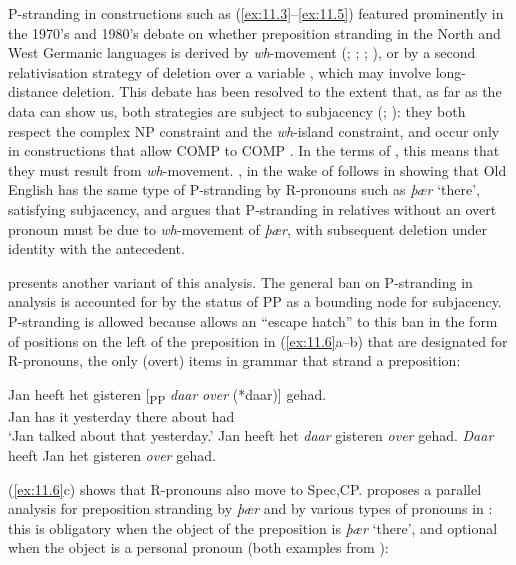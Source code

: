 \documentclass[output=paper]{langsci/langscibook}
\begin{document}
P-stranding in constructions such as (\ref{ex:11.3}--\ref{ex:11.5}) featured prominently in the
1970’s and 1980’s debate on whether preposition stranding in the North and West
Germanic languages is derived by \textit{wh}-movement
(\citealt{Chomsky1977,ChomskyLasnik1977}; \citealt[286--297]{vanRiemsdijk1978};
\citealt{Vat1978}; \citealt{vanKemenade1987}), or by a second relativisation
strategy of deletion over a variable \citep{Maling1976,BresnanGrimshaw1978,Allen1977,Allen1980}, which may
involve long-distance deletion. This debate has been resolved to the extent
that, as far as the data can show us, both strategies are subject to subjacency
(\citealt{Allen1980}; \citealt{vanKemenade1987}): they both respect the complex
NP constraint and the \textit{wh}-island constraint, and occur only in
constructions that allow COMP to COMP . In the terms of
\textcite{Chomsky1977,ChomskyLasnik1977}, this means that they must result from
\textit{wh}-movement. \citet{Vat1978}, in the wake of
\citet{vanRiemsdijk1978} follows \citet{Allen1977} in showing that Old English
has the same type of P-stranding by R-pronouns such
as \textit{þær} ‘there’, satisfying subjacency, and argues that
P-stranding in relatives without an overt pronoun
must be due to \textit{wh}-movement of \textit{þær}, with subsequent deletion
under identity with the antecedent.

 presents another variant of this analysis. The general
ban on P-stranding in  analysis is accounted for by
the status of PP as a bounding node for subjacency.  P-stranding is
allowed because  allows an “escape hatch” to this ban in the form of
positions on the left of the preposition in (\ref{ex:11.6}a--b) that are designated for
R-pronouns, the only (overt) items in  grammar that strand a preposition:

\ea%
    \label{ex:11.6}
    	\ea
	\gll Jan heeft het gisteren [\textsubscript{PP} \textit{daar} \textit{over} (*daar)] gehad.\\
        		Jan has    it   yesterday {}    there  about   {}         had\\
	\glt ‘Jan talked about that yesterday.’
	\ex Jan heeft het \textit{daar} gisteren \textit{over} gehad.
	\ex \textit{Daar} heeft Jan het gisteren \textit{over} gehad.
	\z
\z

(\ref{ex:11.6}c) shows that R-pronouns also move to Spec,CP. 
proposes a parallel analysis for preposition stranding by \textit{þær} and by
various types of pronouns in : this is obligatory when the object of
the preposition is \textit{þær} ‘there’, and optional when the object is a
personal pronoun (both examples from
\citealt[117]{vanKemenade1987}):
\end{document}
